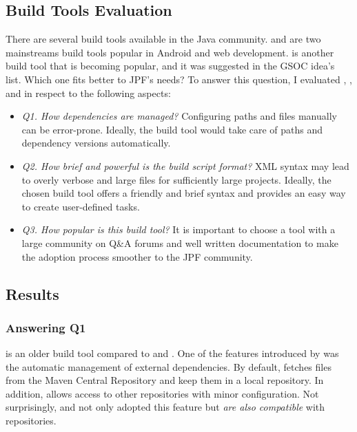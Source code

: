 \documentclass{article}
\begin{document}
\clearpage
\begin{appendices}

\section{Build Tools Evaluation}
\label{sec:eval}

There are several build tools available in the Java community.
\maven{} and \gradle{} are two mainstreams build tools popular in Android and
web development.
\sbt{}\cite{page:sbt} is another build tool that is becoming popular, and it
was suggested in the GSOC idea's list\cite{page:jpf-gsoc18}.
Which one fits better to JPF's needs?
To answer this question, I evaluated \maven{}, \gradle{}, and \sbt{} in respect
to the following aspects:

\begin{itemize}
\item \emph{Q1. How dependencies are managed?} Configuring paths and \jar{}
files manually can be error-prone. Ideally, the build tool would take care of
paths and dependency versions automatically.
\item \emph{Q2. How brief and powerful is the build script format?} XML syntax
may lead to overly verbose and large files for sufficiently large projects.
Ideally, the chosen build tool offers a friendly and brief syntax and provides
an easy way to create user-defined tasks.
\item \emph{Q3. How popular is this build tool?} It is important to choose a
tool with a large community on Q\&A forums and well written documentation to
make the adoption process smoother to the JPF community.
\end{itemize}

\subsection*{Results}
\label{sec:results}

\subsubsection*{Answering Q1}
\maven{} is an older build tool compared to \gradle{} and \ant{}.
One of the features introduced by \maven{} was the automatic management of
external dependencies.
By default, \maven{} fetches \jar{} files from the Maven Central
Repository\cite{page:mvncentral} and keep them in a local repository.
In addition, \maven{} allows access to other repositories\cite{page:mvnrepo}
with minor configuration.
Not surprisingly, \gradle{} and \sbt{} not only adopted this feature but
\emph{are also compatible} with \maven{} repositories.


\end{appendices}
\end{document}
